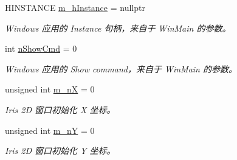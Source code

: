 \begin{DoxyCompactItemize}
\item 
\mbox{\label{struct_iris2_d_1_1_iris_application_1_1_iris_app_start_info_ab52c3d4447fe5c14dbd0f6839dd05032}} 
H\+I\+N\+S\+T\+A\+N\+CE \hyperlink{struct_iris2_d_1_1_iris_application_1_1_iris_app_start_info_ab52c3d4447fe5c14dbd0f6839dd05032}{m\+\_\+h\+Instance} = nullptr
\begin{DoxyCompactList}\small\item\em Windows 应用的 Instance 句柄，来自于 Win\+Main 的参数。 \end{DoxyCompactList}\item 
\mbox{\label{struct_iris2_d_1_1_iris_application_1_1_iris_app_start_info_a45353664bb0d0719cb06eb7763263d7d}} 
int \hyperlink{struct_iris2_d_1_1_iris_application_1_1_iris_app_start_info_a45353664bb0d0719cb06eb7763263d7d}{n\+Show\+Cmd} = 0
\begin{DoxyCompactList}\small\item\em Windows 应用的 Show command，来自于 Win\+Main 的参数。 \end{DoxyCompactList}\item 
\mbox{\label{struct_iris2_d_1_1_iris_application_1_1_iris_app_start_info_af28e48cc9ed52f3e6ed6e9e5c464f6b7}} 
unsigned int \hyperlink{struct_iris2_d_1_1_iris_application_1_1_iris_app_start_info_af28e48cc9ed52f3e6ed6e9e5c464f6b7}{m\+\_\+nX} = 0
\begin{DoxyCompactList}\small\item\em Iris 2D 窗口初始化 X 坐标。 \end{DoxyCompactList}\item 
\mbox{\label{struct_iris2_d_1_1_iris_application_1_1_iris_app_start_info_a451b1ba8aedbae08e32ecc379307ca93}} 
unsigned int \hyperlink{struct_iris2_d_1_1_iris_application_1_1_iris_app_start_info_a451b1ba8aedbae08e32ecc379307ca93}{m\+\_\+nY} = 0
\begin{DoxyCompactList}\small\item\em Iris 2D 窗口初始化 Y 坐标。 \end{DoxyCompactList}\item 

\end{DoxyCompactItemize}
